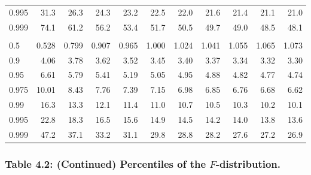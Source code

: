 \documentclass[
]{article}
\begin{document}
\begin{table}[H]
\begin{tabular}{lrrrrrrrrrr}
\hspace{1em}0.995 & 31.3 & 26.3 & 24.3 & 23.2 & 22.5 & 22.0 & 21.6 & 21.4 & 21.1 & 21.0\\
\hspace{1em}0.999 & 74.1 & 61.2 & 56.2 & 53.4 & 51.7 & 50.5 & 49.7 & 49.0 & 48.5 & 48.1\\
\addlinespace[0.3em]
\multicolumn{11}{l}{\textbf{$k_2=5$}}\\
\hspace{1em}0.5 & 0.528 & 0.799 & 0.907 & 0.965 & 1.000 & 1.024 & 1.041 & 1.055 & 1.065 & 1.073\\
\hspace{1em}0.9 & 4.06 & 3.78 & 3.62 & 3.52 & 3.45 & 3.40 & 3.37 & 3.34 & 3.32 & 3.30\\
\hspace{1em}0.95 & 6.61 & 5.79 & 5.41 & 5.19 & 5.05 & 4.95 & 4.88 & 4.82 & 4.77 & 4.74\\
\hspace{1em}0.975 & 10.01 & 8.43 & 7.76 & 7.39 & 7.15 & 6.98 & 6.85 & 6.76 & 6.68 & 6.62\\
\hspace{1em}0.99 & 16.3 & 13.3 & 12.1 & 11.4 & 11.0 & 10.7 & 10.5 & 10.3 & 10.2 & 10.1\\
\hspace{1em}0.995 & 22.8 & 18.3 & 16.5 & 15.6 & 14.9 & 14.5 & 14.2 & 14.0 & 13.8 & 13.6\\
\hspace{1em}0.999 & 47.2 & 37.1 & 33.2 & 31.1 & 29.8 & 28.8 & 28.2 & 27.6 & 27.2 & 26.9\\
\bottomrule
\end{tabular}
\end{table}

\newpage

\hypertarget{table-4.2-continued-percentiles-of-the-f-distribution.}{%
\subsubsection{\texorpdfstring{Table 4.2: (Continued) Percentiles of the
\(F\)-distribution.}{Table 4.2: (Continued) Percentiles of the F-distribution.}}\label{table-4.2-continued-percentiles-of-the-f-distribution.}}
\end{document}
